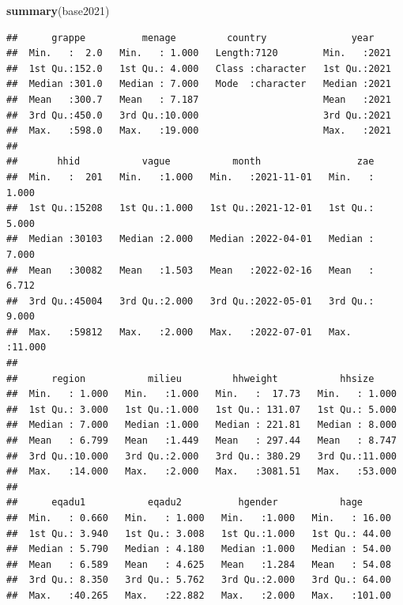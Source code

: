 \documentclass[
]{article}
\newenvironment{Shaded}{\begin{snugshade}}{\end{snugshade}}
\newcommand{\FunctionTok}[1]{\textcolor[rgb]{0.13,0.29,0.53}{\textbf{#1}}}
\newcommand{\NormalTok}[1]{#1}
\begin{document}
\begin{Shaded}
\begin{Highlighting}[]
\FunctionTok{summary}\NormalTok{(base2021)}
\end{Highlighting}
\end{Shaded}

\begin{verbatim}
##      grappe          menage         country               year     
##  Min.   :  2.0   Min.   : 1.000   Length:7120        Min.   :2021  
##  1st Qu.:152.0   1st Qu.: 4.000   Class :character   1st Qu.:2021  
##  Median :301.0   Median : 7.000   Mode  :character   Median :2021  
##  Mean   :300.7   Mean   : 7.187                      Mean   :2021  
##  3rd Qu.:450.0   3rd Qu.:10.000                      3rd Qu.:2021  
##  Max.   :598.0   Max.   :19.000                      Max.   :2021  
##                                                                    
##       hhid           vague           month                 zae        
##  Min.   :  201   Min.   :1.000   Min.   :2021-11-01   Min.   : 1.000  
##  1st Qu.:15208   1st Qu.:1.000   1st Qu.:2021-12-01   1st Qu.: 5.000  
##  Median :30103   Median :2.000   Median :2022-04-01   Median : 7.000  
##  Mean   :30082   Mean   :1.503   Mean   :2022-02-16   Mean   : 6.712  
##  3rd Qu.:45004   3rd Qu.:2.000   3rd Qu.:2022-05-01   3rd Qu.: 9.000  
##  Max.   :59812   Max.   :2.000   Max.   :2022-07-01   Max.   :11.000  
##                                                                       
##      region           milieu         hhweight           hhsize      
##  Min.   : 1.000   Min.   :1.000   Min.   :  17.73   Min.   : 1.000  
##  1st Qu.: 3.000   1st Qu.:1.000   1st Qu.: 131.07   1st Qu.: 5.000  
##  Median : 7.000   Median :1.000   Median : 221.81   Median : 8.000  
##  Mean   : 6.799   Mean   :1.449   Mean   : 297.44   Mean   : 8.747  
##  3rd Qu.:10.000   3rd Qu.:2.000   3rd Qu.: 380.29   3rd Qu.:11.000  
##  Max.   :14.000   Max.   :2.000   Max.   :3081.51   Max.   :53.000  
##                                                                     
##      eqadu1           eqadu2          hgender           hage       
##  Min.   : 0.660   Min.   : 1.000   Min.   :1.000   Min.   : 16.00  
##  1st Qu.: 3.940   1st Qu.: 3.008   1st Qu.:1.000   1st Qu.: 44.00  
##  Median : 5.790   Median : 4.180   Median :1.000   Median : 54.00  
##  Mean   : 6.589   Mean   : 4.625   Mean   :1.284   Mean   : 54.08  
##  3rd Qu.: 8.350   3rd Qu.: 5.762   3rd Qu.:2.000   3rd Qu.: 64.00  
##  Max.   :40.265   Max.   :22.882   Max.   :2.000   Max.   :101.00  

\end{verbatim}
\end{document}
